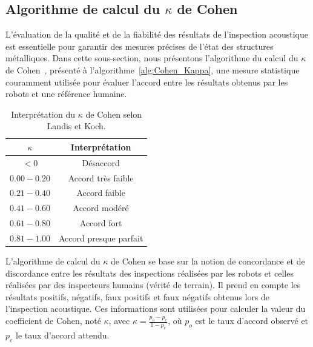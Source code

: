 \documentclass[francais,RandD]{rapportPFE}
\begin{document}
		\subsection*{Algorithme de calcul du $\kappa$ de Cohen}
			L'évaluation de la qualité et de la fiabilité des résultats de l'inspection acoustique est essentielle pour garantir des mesures précises de l'état des structures métalliques.
			Dans cette sous-section, nous présentons l'algorithme du calcul du $\kappa$ de Cohen~\cite{enwiki:1130024730}, présenté à l'algorithme~\ref{alg:Cohen_Kappa}, une mesure statistique couramment utilisée pour évaluer l'accord entre les résultats obtenus par les robots et une référence humaine.

			\begin{table}[h!]
				\centering
				\begin{tabular}{|c|c|}
					\hline
					$\kappa$ & Interprétation \\
					\hline
					$< 0$ & Désaccord \\
					\hline
					$0.00 - 0.20$ & Accord très faible \\
					\hline
					$0.21 - 0.40$ & Accord faible \\
					\hline
					$0.41 - 0.60$ & Accord modéré \\
					\hline
					$0.61 - 0.80$ & Accord fort \\
					\hline
					$0.81 - 1.00$ & Accord presque parfait \\
					\hline
				\end{tabular}
				\caption{Interprétation du $\kappa$ de Cohen selon Landis et Koch.}
				\label{tab:Kappa_Cohen}
			\end{table}

			L'algorithme de calcul du $\kappa$ de Cohen se base sur la notion de concordance et de discordance entre les résultats des inspections réalisées par les robots et celles réalisées par des inspecteurs humains (vérité de terrain).
			Il prend en compte les résultats positifs, négatifs, faux positifs et faux négatifs obtenus lors de l'inspection acoustique.
			Ces informations sont utilisées pour calculer la valeur du coefficient de Cohen, noté $\kappa$, avec $\kappa = \frac{p_o - p_e}{1 - p_e}$, où $p_o$ est le taux d'accord observé et $p_e$ le taux d'accord attendu.
\end{document}
